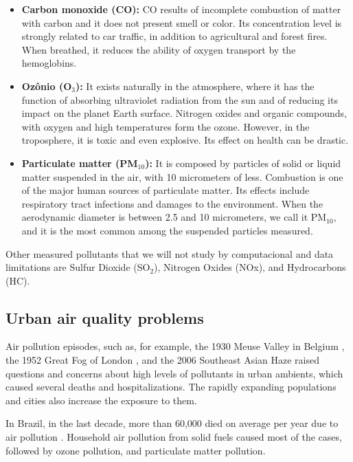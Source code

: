 \begin{itemize}
    \item \textbf{Carbon monoxide (CO):} CO results of incomplete combustion
    of matter with carbon and it does not present smell or color. Its
    concentration level is strongly related to car traffic, in addition to
    agricultural and forest fires. When breathed, it reduces the ability of
    oxygen transport by the hemoglobins.  

    \item \textbf{Ozônio (O$_3$):} It exists naturally in the atmosphere,
    where it has the function of absorbing ultraviolet radiation from the sun
    and of reducing its impact on the planet Earth surface. Nitrogen oxides and
    organic compounds, with oxygen and high temperatures form the ozone. However, in
    the troposphere, it is toxic and even explosive. Its
    effect on health can be drastic. 

    \item \textbf{Particulate matter (PM$_{10}$):} It is composed by particles
    of solid or liquid matter suspended in the air, with 10 micrometers of
    less. Combustion is one of the major human sources of particulate matter.
    Its effects include respiratory tract infections and damages to the
    environment. When the aerodynamic diameter is between 2.5 and 10
    micrometers, we call it PM$_10$, and it is the most common among the
    suspended particles measured.  

\end{itemize}

Other measured pollutants that we will not study by computacional and data
limitations are Sulfur Dioxide (SO$_2$), Nitrogen Oxides (NOx), and Hydrocarbons (HC).

\subsection{Urban air quality problems}

Air pollution episodes, such as, for example, the 1930 Meuse Valley in Belgium
\cite{nemery2001}, the 1952 Great Fog of London
\cite{polivka2018}, and the 2006 Southeast Asian Haze \cite{jones2006} raised
questions and concerns about high levels of pollutants in urban ambients,
which caused several deaths and hospitalizations. The rapidly expanding
populations and cities also increase the exposure to them.

In Brazil, in the last decade, more than 60,000 died on average per year due
to air pollution \cite{data-deaths-air-pollution}. Household air pollution
from solid fuels caused most of the cases, followed by ozone pollution, and
particulate matter pollution. 

